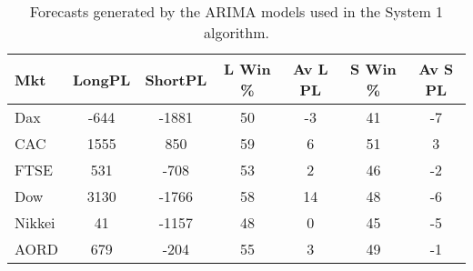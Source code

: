 \begin{table}[ht]
\centering
\caption[Forecasts generated by the ARIMA models used in the System 1 algorithm]{Forecasts generated by the ARIMA models used in the System 1 algorithm.} 
\label{tab:chp_ts:arima1}
\begin{tabular}{lcccccc}
  \toprule Mkt & LongPL & ShortPL & L Win \% & Av L PL & S Win \% & Av S PL \\ 
  \midrule Dax & -644 & -1881 & 50 & -3 & 41 & -7 \\ 
  CAC & 1555 & 850 & 59 & 6 & 51 & 3 \\ 
  FTSE & 531 & -708 & 53 & 2 & 46 & -2 \\ 
  Dow & 3130 & -1766 & 58 & 14 & 48 & -6 \\ 
  Nikkei & 41 & -1157 & 48 & 0 & 45 & -5 \\ 
  AORD & 679 & -204 & 55 & 3 & 49 & -1 \\ 
   \bottomrule \end{tabular}
\end{table}
